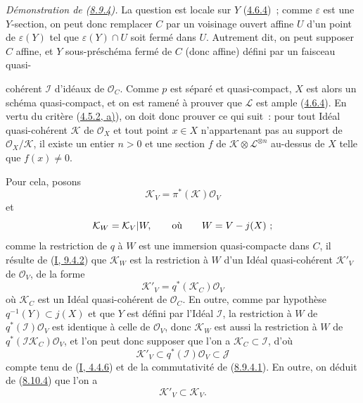 \begin{env}[8.10.6]
\label{II.8.10.6-fr}
\emph{Démonstration de (\hyperref[II.8.9.4-fr]{8.9.4}).} La question est
locale sur $Y$ (\hyperref[II.4.6.4-fr]{4.6.4})~; comme $\varepsilon$ est une
$Y$-section, on peut donc remplacer $C$ par un voisinage ouvert affine $U$
d'un point de $\varepsilon(Y)$ tel que $\varepsilon(Y)\cap U$ soit fermé dans
$U$. Autrement dit, on peut supposer $C$ affine, et $Y$ sous-préschéma fermé
de $C$ (donc affine) défini par un faisceau quasi-

cohérent $\mathcal{I}$ d'idéaux de $\mathcal{O}_C$. Comme $p$ est séparé et
quasi-compact, $X$ est alors un schéma quasi-compact, et on est ramené à
prouver que $\mathcal{L}$ est ample
(\hyperref[II.4.6.4-fr]{4.6.4}). En vertu du critère
(\hyperref[II.4.5.2-fr]{4.5.2, a)}), on doit donc prouver ce qui suit~: pour
tout Idéal quasi-cohérent $\mathcal{K}$ de $\mathcal{O}_X$ et tout point
$x\in X$ n'appartenant pas au support de $\mathcal{O}_X/\mathcal{K}$, il
existe un entier $n>0$ et une section $f$ de
$\mathcal{K}\otimes\mathcal{L}^{\otimes n}$ au-dessus de $X$ telle que
$f(x)\neq0$.

Pour cela, posons
\[
  \mathcal{K}_V=\pi^*(\mathcal{K})\mathcal{O}_V
\]
et
\[
  \mathcal{K}_W=\mathcal{K}_V|W,\qquad\hbox{où}\qquad W=V-j(X)~;
\]
comme la restriction de $q$ à $W$ est une immersion quasi-compacte dans $C$,
il résulte de (\hyperref[I.9.4.2-fr]{I, 9.4.2}) que $\mathcal{K}_W$ est la
restriction à $W$ d'un Idéal quasi-cohérent $\mathcal{K}'_V$ de
$\mathcal{O}_V$, de la forme
\[
  \mathcal{K}'_V=q^*(\mathcal{K}_C)\mathcal{O}_V
\]
où $\mathcal{K}_C$ est un Idéal quasi-cohérent de $\mathcal{O}_C$. En outre,
comme par hypothèse $q^{-1}(Y)\subset j(X)$ et que $Y$ est défini par l'Idéal
$\mathcal{I}$, la restriction à $W$ de $q^*(\mathcal{I})\mathcal{O}_V$ est
identique à celle de $\mathcal{O}_V$, donc $\mathcal{K}_W$ est aussi la
restriction à $W$ de $q^*(\mathcal{I}\mathcal{K}_C)\mathcal{O}_V$, et l'on
peut donc supposer que l'on a $\mathcal{K}_C\subset\mathcal{I}$, d'où
\begin{equation}
\label{II.8.10.6.1-fr}
  \mathcal{K}'_V\subset q^*(\mathcal{I})\mathcal{O}_V\subset\mathcal{J}
\tag{8.10.6.1}
\end{equation}
compte tenu de (\hyperref[I.4.4.6-fr]{I, 4.4.6}) et de la commutativité de
(\hyperref[II.8.9.4.1-fr]{8.9.4.1}). En outre, on déduit de
(\hyperref[II.8.10.4-fr]{8.10.4}) que l'on a
\begin{equation}
\label{II.8.10.6.2-fr}
  \mathcal{K}'_V\subset\mathcal{K}_V.
\tag{8.10.6.2}
\end{equation}


\end{env}
